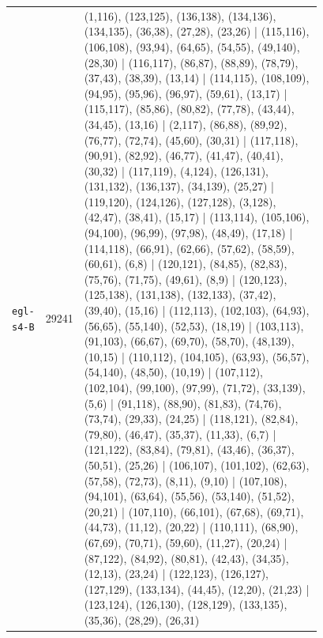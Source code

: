\begin{landscape}
\begin{longtable}{lr>{\tiny\raggedright\arraybackslash}p{0.78\linewidth}}
\texttt{egl-s4-B} & 29241 & (1,116), (123,125), (136,138), (134,136), (134,135), (36,38), (27,28), (23,26) | (115,116), (106,108), (93,94), (64,65), (54,55), (49,140), (28,30) | (116,117), (86,87), (88,89), (78,79), (37,43), (38,39), (13,14) | (114,115), (108,109), (94,95), (95,96), (96,97), (59,61), (13,17) | (115,117), (85,86), (80,82), (77,78), (43,44), (34,45), (13,16) | (2,117), (86,88), (89,92), (76,77), (72,74), (45,60), (30,31) | (117,118), (90,91), (82,92), (46,77), (41,47), (40,41), (30,32) | (117,119), (4,124), (126,131), (131,132), (136,137), (34,139), (25,27) | (119,120), (124,126), (127,128), (3,128), (42,47), (38,41), (15,17) | (113,114), (105,106), (94,100), (96,99), (97,98), (48,49), (17,18) | (114,118), (66,91), (62,66), (57,62), (58,59), (60,61), (6,8) | (120,121), (84,85), (82,83), (75,76), (71,75), (49,61), (8,9) | (120,123), (125,138), (131,138), (132,133), (37,42), (39,40), (15,16) | (112,113), (102,103), (64,93), (56,65), (55,140), (52,53), (18,19) | (103,113), (91,103), (66,67), (69,70), (58,70), (48,139), (10,15) | (110,112), (104,105), (63,93), (56,57), (54,140), (48,50), (10,19) | (107,112), (102,104), (99,100), (97,99), (71,72), (33,139), (5,6) | (91,118), (88,90), (81,83), (74,76), (73,74), (29,33), (24,25) | (118,121), (82,84), (79,80), (46,47), (35,37), (11,33), (6,7) | (121,122), (83,84), (79,81), (43,46), (36,37), (50,51), (25,26) | (106,107), (101,102), (62,63), (57,58), (72,73), (8,11), (9,10) | (107,108), (94,101), (63,64), (55,56), (53,140), (51,52), (20,21) | (107,110), (66,101), (67,68), (69,71), (44,73), (11,12), (20,22) | (110,111), (68,90), (67,69), (70,71), (59,60), (11,27), (20,24) | (87,122), (84,92), (80,81), (42,43), (34,35), (12,13), (23,24) | (122,123), (126,127), (127,129), (133,134), (44,45), (12,20), (21,23) | (123,124), (126,130), (128,129), (133,135), (35,36), (28,29), (26,31) \\[2pt]

\end{longtable}
\end{landscape}
